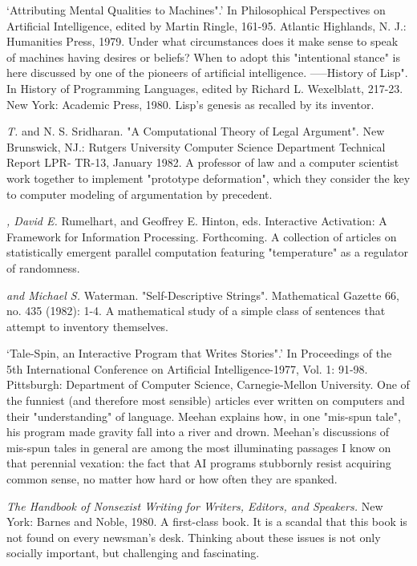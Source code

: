  `Attributing Mental Qualities to Machines".' In Philosophical Perspectives on Artificial Intelligence, edited by Martin Ringle, 161-95. Atlantic Highlands, N. J.: Humanities Press, 1979. Under what circumstances does it make sense to speak of machines having desires or beliefs? When to adopt this "intentional stance" is here discussed by one of the pioneers of artificial intelligence. -----History of Lisp". In History of Programming Languages, edited by Richard L. Wexelblatt, 217-23. New York: Academic Press, 1980. Lisp's genesis as recalled by its inventor.

 {\sl T.} and N. S. Sridharan. "A Computational Theory of Legal Argument". New Brunswick, NJ.: Rutgers University Computer Science Department Technical Report LPR- TR-13, January 1982. A professor of law and a computer scientist work together to implement "prototype deformation", which they consider the key to computer modeling of argumentation by precedent.

 {\sl , David E.} Rumelhart, and Geoffrey E. Hinton, eds. Interactive Activation: A Framework for Information Processing. Forthcoming. A collection of articles on statistically emergent parallel computation featuring "temperature" as a regulator of randomness.

 {\sl and Michael S.} Waterman. "Self-Descriptive Strings". Mathematical Gazette 66, no. 435 (1982): 1-4. A mathematical study of a simple class of sentences that attempt to inventory themselves.

 `Tale-Spin, an Interactive Program that Writes Stories".' In Proceedings of the 5th International Conference on Artificial Intelligence-1977, Vol. 1: 91-98. Pittsburgh: Department of Computer Science, Carnegie-Mellon University. One of the funniest (and therefore most sensible) articles ever written on computers and their "understanding" of language. Meehan explains how, in one "mis-spun tale", his program made gravity fall into a river and drown. Meehan's discussions of mis-spun tales in general are among the most illuminating passages I know on that perennial vexation: the fact that AI programs stubbornly resist acquiring common sense, no matter how hard or how often they are spanked.

 {\sl The Handbook of Nonsexist Writing for Writers, Editors, and Speakers.} New York: Barnes and Noble, 1980. A first-class book. It is a scandal that this book is not found on every newsman's desk. Thinking about these issues is not only socially important, but challenging and fascinating.

